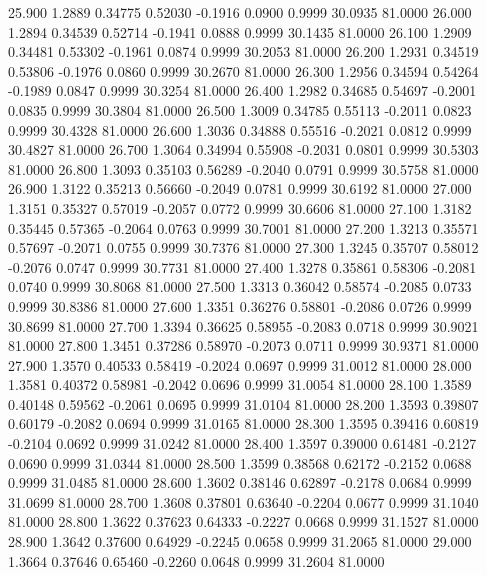   25.900   1.2889   0.34775   0.52030  -0.1916   0.0900   0.9999  30.0935  81.0000
  26.000   1.2894   0.34539   0.52714  -0.1941   0.0888   0.9999  30.1435  81.0000
  26.100   1.2909   0.34481   0.53302  -0.1961   0.0874   0.9999  30.2053  81.0000
  26.200   1.2931   0.34519   0.53806  -0.1976   0.0860   0.9999  30.2670  81.0000
  26.300   1.2956   0.34594   0.54264  -0.1989   0.0847   0.9999  30.3254  81.0000
  26.400   1.2982   0.34685   0.54697  -0.2001   0.0835   0.9999  30.3804  81.0000
  26.500   1.3009   0.34785   0.55113  -0.2011   0.0823   0.9999  30.4328  81.0000
  26.600   1.3036   0.34888   0.55516  -0.2021   0.0812   0.9999  30.4827  81.0000
  26.700   1.3064   0.34994   0.55908  -0.2031   0.0801   0.9999  30.5303  81.0000
  26.800   1.3093   0.35103   0.56289  -0.2040   0.0791   0.9999  30.5758  81.0000
  26.900   1.3122   0.35213   0.56660  -0.2049   0.0781   0.9999  30.6192  81.0000
  27.000   1.3151   0.35327   0.57019  -0.2057   0.0772   0.9999  30.6606  81.0000
  27.100   1.3182   0.35445   0.57365  -0.2064   0.0763   0.9999  30.7001  81.0000
  27.200   1.3213   0.35571   0.57697  -0.2071   0.0755   0.9999  30.7376  81.0000
  27.300   1.3245   0.35707   0.58012  -0.2076   0.0747   0.9999  30.7731  81.0000
  27.400   1.3278   0.35861   0.58306  -0.2081   0.0740   0.9999  30.8068  81.0000
  27.500   1.3313   0.36042   0.58574  -0.2085   0.0733   0.9999  30.8386  81.0000
  27.600   1.3351   0.36276   0.58801  -0.2086   0.0726   0.9999  30.8699  81.0000
  27.700   1.3394   0.36625   0.58955  -0.2083   0.0718   0.9999  30.9021  81.0000
  27.800   1.3451   0.37286   0.58970  -0.2073   0.0711   0.9999  30.9371  81.0000
  27.900   1.3570   0.40533   0.58419  -0.2024   0.0697   0.9999  31.0012  81.0000
  28.000   1.3581   0.40372   0.58981  -0.2042   0.0696   0.9999  31.0054  81.0000
  28.100   1.3589   0.40148   0.59562  -0.2061   0.0695   0.9999  31.0104  81.0000
  28.200   1.3593   0.39807   0.60179  -0.2082   0.0694   0.9999  31.0165  81.0000
  28.300   1.3595   0.39416   0.60819  -0.2104   0.0692   0.9999  31.0242  81.0000
  28.400   1.3597   0.39000   0.61481  -0.2127   0.0690   0.9999  31.0344  81.0000
  28.500   1.3599   0.38568   0.62172  -0.2152   0.0688   0.9999  31.0485  81.0000
  28.600   1.3602   0.38146   0.62897  -0.2178   0.0684   0.9999  31.0699  81.0000
  28.700   1.3608   0.37801   0.63640  -0.2204   0.0677   0.9999  31.1040  81.0000
  28.800   1.3622   0.37623   0.64333  -0.2227   0.0668   0.9999  31.1527  81.0000
  28.900   1.3642   0.37600   0.64929  -0.2245   0.0658   0.9999  31.2065  81.0000
  29.000   1.3664   0.37646   0.65460  -0.2260   0.0648   0.9999  31.2604  81.0000
